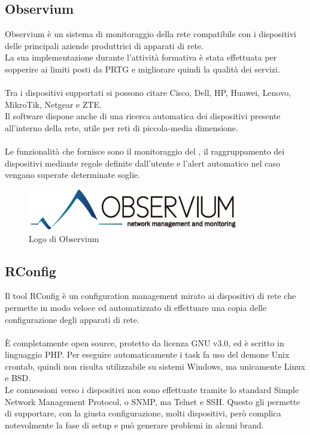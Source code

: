 \documentclass[Tesi.tex]{subfiles}
\begin{document}
\subsection{Observium}
Observium è un sistema di monitoraggio della rete compatibile con i dispositivi delle principali aziende produttrici di apparati di rete. \\
La sua implementazione durante l'attività formativa è stata effettuata per sopperire ai limiti posti da PRTG e migliorare quindi la qualità dei servizi. \\\\
Tra i dispositivi supportati si possono citare Cisco, Dell, HP, Huawei, Lenovo, MikroTik, Netgear e ZTE. \\
Il software dispone anche di una ricerca automatica dei dispositivi presente all'interno della rete, utile per reti di piccola-media dimensione. \\\\
Le funzionalità che fornisce sono il monitoraggio del , il raggruppamento dei dispositivi mediante regole definite dall'utente e l'alert automatico nel caso vengano superate determinate soglie.
\begin{figure}[H]
	\centering
	\includegraphics[width=0.4\linewidth]{"images/logo/Observium_logo"}
	\caption{Logo di Observium}
	\label{fig:Logo di Observium}
\end{figure}

\subsection{RConfig}
Il tool RConfig è un configuration management mirato ai dispositivi di rete che permette in modo veloce ed automatizzato di effettuare una copia delle configurazione degli apparati di rete. \\\\
\`{E} completamente open source, protetto da licenza GNU v3.0, ed è scritto in linguaggio PHP. Per eseguire automaticamente i task fa uso del demone Unix crontab, quindi non risulta utilizzabile su sistemi Windows, ma unicamente Linux e BSD. \\
Le connessioni verso i dispositivi non sono effettuate tramite lo standard Simple Network Management Protocol, o SNMP, ma Telnet e SSH. Questo gli permette di supportare, con la giusta configurazione, molti dispositivi, però complica notevolmente la fase di setup e può generare problemi in alcuni brand.
\end{document}
